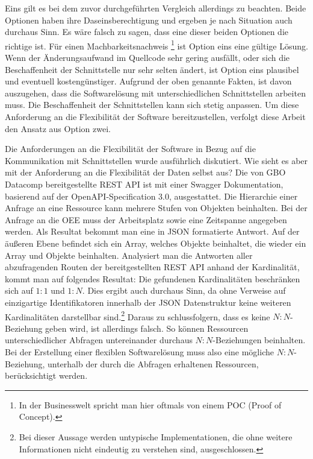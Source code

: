 Eins gilt es bei dem zuvor durchgeführten Vergleich allerdings zu beachten. Beide Optionen haben ihre Daseinsberechtigung
und ergeben je nach Situation auch durchaus Sinn. Es wäre falsch zu sagen, dass eine dieser beiden Optionen die richtige ist. Für einen
Machbarkeitsnachweis \footnote{In der Businesswelt spricht man hier oftmals von einem POC (Proof of Concept).}
ist Option eins eine gültige Lösung. Wenn der Änderungsaufwand im Quellcode sehr gering ausfällt, oder sich
die Beschaffenheit der Schnittstelle nur sehr selten ändert, ist Option eins plausibel und eventuell kostengünstiger.
Aufgrund der oben genannte Fakten, ist davon auszugehen, dass die Softwarelösung mit unterschiedlichen Schnittstellen arbeiten muss.
Die Beschaffenheit der Schnittstellen kann sich stetig anpassen. Um diese Anforderung an die Flexibilität
der Software bereitzustellen, verfolgt diese Arbeit den Ansatz aus Option zwei.

Die Anforderungen an die Flexibilität der Software in Bezug auf die Kommunikation mit Schnittstellen wurde
ausführlich diskutiert. Wie sieht es aber mit der Anforderung an die Flexibilität der Daten selbst aus?
Die von GBO Datacomp bereitgestellte REST API ist mit einer Swagger Dokumentation, basierend auf der
OpenAPI-Specification 3.0, ausgestattet. Die Hierarchie einer Anfrage an eine Ressource kann mehrere Stufen von Objekten beinhalten.
Bei der Anfrage an die OEE muss der Arbeitsplatz sowie eine Zeitspanne angegeben werden. Als Resultat bekommt man eine 
in JSON formatierte Antwort. Auf der äußeren Ebene befindet sich ein Array, welches Objekte beinhaltet, die wieder ein
Array und Objekte beinhalten. Analysiert man die Antworten aller abzufragenden Routen der bereitgestellten REST API anhand der Kardinalität,
kommt man auf folgendes Resultat: Die gefundenen Kardinalitäten beschränken sich auf \(1:1\) und \(1:N\). Dies ergibt auch
durchaus Sinn, da ohne Verweise auf einzigartige Identifikatoren innerhalb der JSON Datenstruktur keine weiteren
Kardinalitäten darstellbar sind.\footnote{Bei dieser Aussage werden untypische Implementationen,
die ohne weitere Informationen nicht eindeutig zu verstehen sind, ausgeschlossen.}
Daraus zu schlussfolgern, dass es keine \(N:N\)-Beziehung geben wird, ist allerdings falsch.
So können Ressourcen unterschiedlicher Abfragen untereinander durchaus \(N:N\)-Beziehungen beinhalten. Bei der Erstellung
einer flexiblen Softwarelösung muss also eine mögliche \(N:N\)-Beziehung, unterhalb der durch die Abfragen erhaltenen
Ressourcen, berücksichtigt werden.

